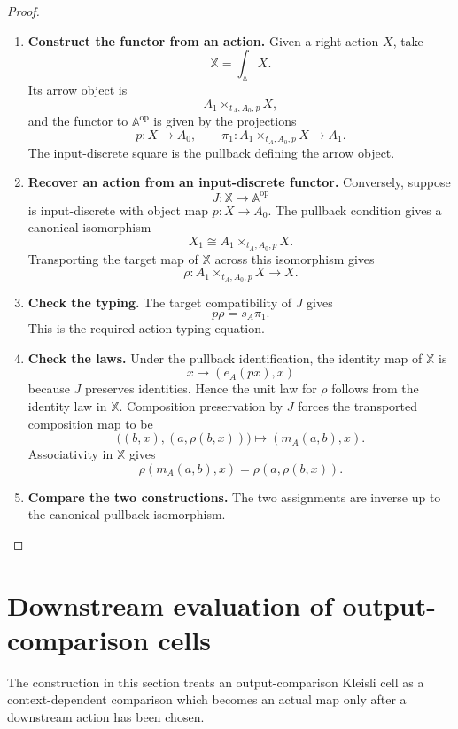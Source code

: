 \begin{proof}
\leavevmode
\begin{enumerate}
\item \textbf{Construct the functor from an action.}
Given a right action \(X\), take
\[
\mathbb X=\int_{\mathbb A}X.
\]
Its arrow object is
\[
A_1\times_{t_A,A_0,p}X,
\]
and the functor to \(\mathbb A^{\mathrm{op}}\) is given by the projections
\[
p:X\to A_0,
\qquad
\pi_1:A_1\times_{t_A,A_0,p}X\to A_1.
\]
The input-discrete square is the pullback defining the arrow object.

\item \textbf{Recover an action from an input-discrete functor.}
Conversely, suppose
\[
J:\mathbb X\to\mathbb A^{\mathrm{op}}
\]
is input-discrete with object map \(p:X\to A_0\). The pullback condition gives
a canonical isomorphism
\[
X_1\cong A_1\times_{t_A,A_0,p}X.
\]
Transporting the target map of \(\mathbb X\) across this isomorphism gives
\[
\rho:A_1\times_{t_A,A_0,p}X\to X.
\]

\item \textbf{Check the typing.}
The target compatibility of \(J\) gives
\[
p\rho=s_A\pi_1.
\]
This is the required action typing equation.

\item \textbf{Check the laws.}
Under the pullback identification, the identity map of \(\mathbb X\) is
\[
x\longmapsto(e_A(px),x)
\]
because \(J\) preserves identities. Hence the unit law for \(\rho\) follows
from the identity law in \(\mathbb X\). Composition preservation by \(J\)
forces the transported composition map to be
\[
\bigl((b,x),(a,\rho(b,x))\bigr)
\longmapsto
(m_A(a,b),x).
\]
Associativity in \(\mathbb X\) gives
\[
\rho(m_A(a,b),x)=\rho(a,\rho(b,x)).
\]

\item \textbf{Compare the two constructions.}
The two assignments are inverse up to the canonical pullback isomorphism.
\end{enumerate}
\end{proof}

\section{Downstream evaluation of output-comparison cells}
\label{sec:relative-kleisli-evaluation}

The construction in this section treats an output-comparison Kleisli cell as a
context-dependent comparison which becomes an actual map only after a
downstream action has been chosen.

